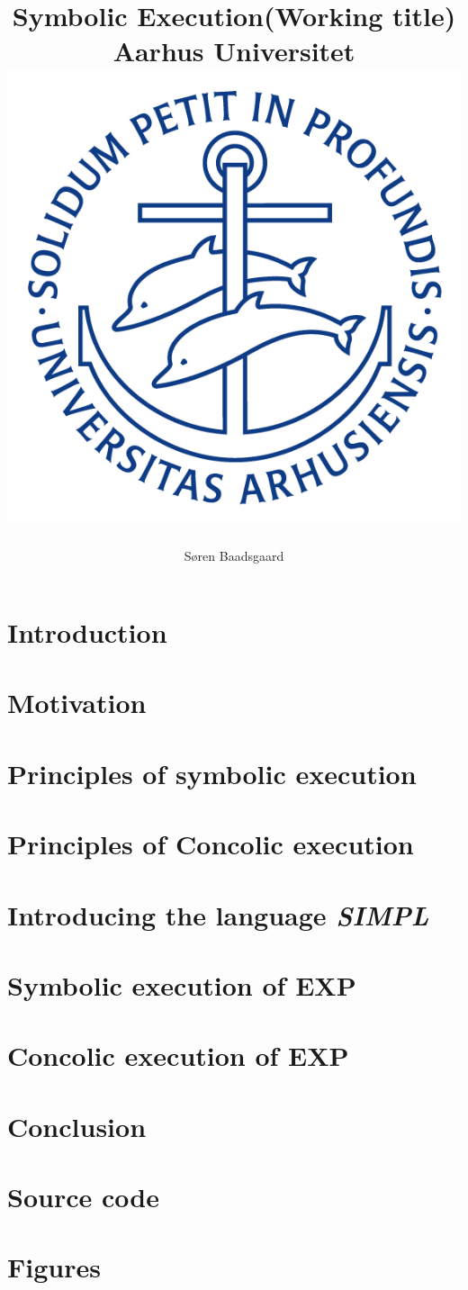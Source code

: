 \documentclass[]{report}
\title{
	\textbf{Symbolic Execution(Working title)}\\
	{\large Aarhus Universitet}\\
	{\includegraphics[scale=0.5]{ausegl_blaa.png}}	
	}
\author{Søren Baadsgaard}
\newcommand{\explanguage}{\textsl{SIMPL }}
\begin{document}
\maketitle

\begin{abstract}
\end{abstract}

\tableofcontents

\chapter{Introduction}
	
	
\chapter{Motivation}
	
\chapter{Principles of symbolic execution}
	

\chapter{Principles of Concolic execution}

\chapter{Introducing the language \explanguage}
	
\chapter{Symbolic execution of EXP}
\chapter{Concolic execution of EXP}

\chapter{Conclusion}
	

\appendix

\chapter{Source code}

\chapter{Figures}



\end{document}
